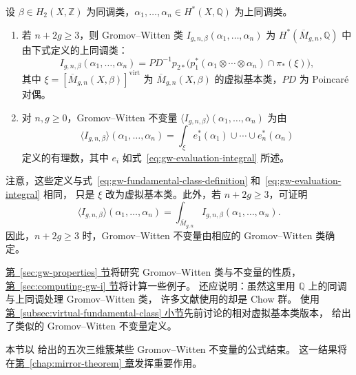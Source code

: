 \begin{definition}\label{def:gw-algebraic-invariants}
设 $\beta\in H_2(X,\mathbb Z)$ 为同调类，$\alpha_1,\ldots,\alpha_n\in H^*(X,\mathbb Q)$ 为上同调类。
\begin{enumerate}[label=(\roman*)]
\item 若 $n+2g\geq3$，则 Gromov--Witten 类 $I_{g,n,\beta}(\alpha_1,\ldots,\alpha_n)$ 为
$H^*(\overline M_{g,n},\mathbb Q)$ 中由下式定义的上同调类：
\[
I_{g,n,\beta}(\alpha_1,\ldots,\alpha_n)
=PD^{-1}p_{2*}\bigl(p_1^*(\alpha_1\otimes\cdots\otimes\alpha_n)\cap\pi_*(\xi)\bigr),
\]
其中 $\xi=[\overline M_{g,n}(X,\beta)]^{\mathrm{virt}}$ 为
$\overline M_{g,n}(X,\beta)$ 的虚拟基本类，$PD$ 为 Poincaré 对偶。
\item 对 $n,g\geq0$，Gromov--Witten 不变量
$\langle I_{g,n,\beta}\rangle(\alpha_1,\ldots,\alpha_n)$ 为由
\[
\langle I_{g,n,\beta}\rangle(\alpha_1,\ldots,\alpha_n)
=\int_\xi e_1^*(\alpha_1)\cup\cdots\cup e_n^*(\alpha_n)
\]
定义的有理数，其中 $e_i$ 如式~\eqref{eq:gw-evaluation-integral} 所述。
\end{enumerate}
\end{definition}
注意，这些定义与式~\eqref{eq:gw-fundamental-class-definition} 和~\eqref{eq:gw-evaluation-integral} 相同，
只是 $\xi$ 改为虚拟基本类。此外，若 $n+2g\geq3$，可证明
\[
\langle I_{g,n,\beta}\rangle(\alpha_1,\ldots,\alpha_n)
=\int_{\overline M_{g,n}}I_{g,n,\beta}(\alpha_1,\ldots,\alpha_n).
\]
因此，$n+2g\geq3$ 时，Gromov--Witten 不变量由相应的 Gromov--Witten 类确定。

\hyperref[sec:gw-properties]{第~\ref*{sec:gw-properties} 节}将研究 Gromov--Witten 类与不变量的性质，\hyperref[sec:computing-gw-i]{第~\ref*{sec:computing-gw-i} 节}将计算一些例子。
还应说明：虽然这里用 $\mathbb Q$ 上的同调与上同调处理 Gromov--Witten 类，
许多文献使用的却是 Chow 群。 使用\hyperref[subsec:virtual-fundamental-class]{第~\ref*{subsec:virtual-fundamental-class} 小节}先前讨论的相对虚拟基本类版本，
给出了类似的 Gromov--Witten 不变量定义。

本节以  给出的五次三维簇某些 Gromov--Witten 不变量的公式结束。
这一结果将在\hyperref[chap:mirror-theorem]{第~\ref*{chap:mirror-theorem} 章}发挥重要作用。

